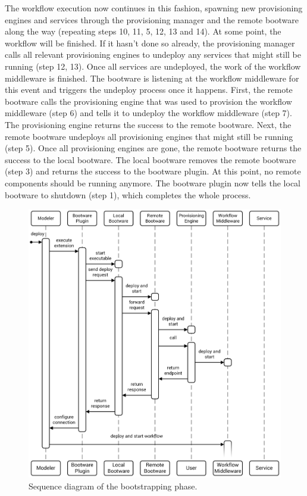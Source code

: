 The workflow execution now continues in this fashion, spawning new provisioning engines and services through the provisioning manager and the remote bootware along the way (repeating steps 10, 11, 5, 12, 13 and 14).
At some point, the workflow will be finished.
If it hasn't done so already, the provisioning manager calls all relevant provisioning engines to undeploy any services that might still be running (step 12, 13).
Once all services are undeployed, the work of the workflow middleware is finished.
The bootware is listening at the workflow middleware for this event and triggers the undeploy process once it happens.
First, the remote bootware calls the provisioning engine that was used to provision the workflow middleware (step 6) and tells it to undeploy the workflow middleware (step 7).
The provisioning engine returns the success to the remote bootware.
Next, the remote bootware undeploys all provisioning engines that might still be running (step 5).
Once all provisioning engines are gone, the remote bootware returns the success to the local bootware.
The local bootware removes the remote bootware (step 3) and returns the success to the bootware plugin.
At this point, no remote components should be running anymore.
The bootware plugin now tells the local bootware to shutdown (step 1), which completes the whole process.

\begin{figure}[!htbp]
	\centering
	\includegraphics[resolution=600]{process/assets/bootstrapping_sequence}
	\caption{Sequence diagram of the bootstrapping phase.}
	\label{image:startup_sequence}
\end{figure}

